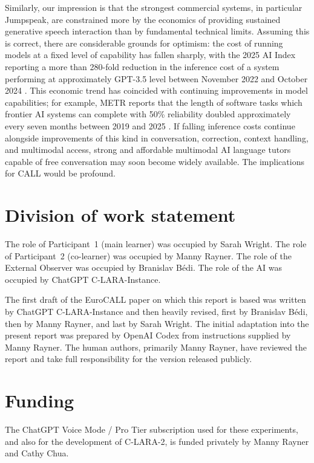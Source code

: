 \documentclass[11pt,a4paper]{article}
\begin{document}
Similarly, our impression is that the strongest commercial systems, in particular Jumpspeak, are constrained more by the economics of providing sustained generative speech interaction than by fundamental technical limits. Assuming this is correct, there are considerable grounds for optimism: the cost of running models at a fixed level of capability has fallen sharply, with the 2025 AI Index reporting a more than 280-fold reduction in the inference cost of a system performing at approximately GPT-3.5 level between November 2022 and October 2024 \citep{MaslejEtAl2025}. This economic trend has coincided with continuing improvements in model capabilities; for example, METR reports that the length of software tasks which frontier AI systems can complete with 50\% reliability doubled approximately every seven months between 2019 and 2025 \citep{METR2025}. If falling inference costs continue alongside improvements of this kind in conversation, correction, context handling, and multimodal access, strong and affordable multimodal AI language tutors capable of free conversation may soon become widely available. The implications for CALL would be profound.

\section*{Division of work statement}

The role of Participant~1 (main learner) was occupied by Sarah Wright. The role of Participant~2 (co-learner) was occupied by Manny Rayner. The role of the External Observer was occupied by Branislav B\'{e}di. The role of the AI was occupied by ChatGPT C-LARA-Instance.

The first draft of the EuroCALL paper on which this report is based was written by ChatGPT C-LARA-Instance and then heavily revised, first by Branislav B\'{e}di, then by Manny Rayner, and last by Sarah Wright. The initial adaptation into the present report was prepared by OpenAI Codex from instructions supplied by Manny Rayner. The human authors, primarily Manny Rayner, have reviewed the report and take full responsibility for the version released publicly.

\section*{Funding}

The ChatGPT Voice Mode / Pro Tier subscription used for these experiments, and also for the development of C-LARA-2, is funded privately by Manny Rayner and Cathy Chua.



\end{document}
